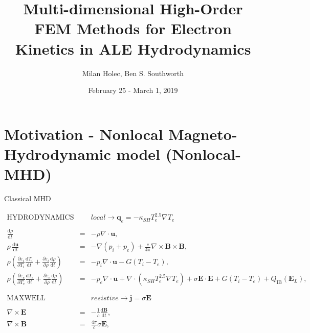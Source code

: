 \documentclass[8pt, compress]{beamer}
\title{{\Huge Multi-dimensional High-Order FEM Methods for Electron Kinetics in ALE Hydrodynamics}}
\date{{\huge February 25 - March 1, 2019}}
\author[Last Name]{{\Huge Milan Holec, Ben S. Southworth}}
\newcommand{\vect}[1]{\boldsymbol{#1}}
\newcommand{\dI}{\text{d}}
\newcommand{\E}{\vect{E}}
\newcommand{\Te}{T_e}
\begin{document}
\begin{frame}
 \titlepage
\end{frame}

\begin{frame}
  \tableofcontents
\end{frame}

\section{Motivation - Nonlocal Magneto-Hydrodynamic model (Nonlocal-MHD)}

\begin{frame}
\begin{center}
{\huge Classical MHD}  

\begin{eqnarray}
  \text{HYDRODYNAMICS} && 
  local \rightarrow \vect{q}_e = - \kappa_{SH} \Te^{2.5} \nabla \Te \nonumber \\
  && \nonumber \\
  \frac{\dI \rho}{\dI t} &=& - \rho\nabla\cdot\vect{u} , 
  \nonumber\\ 
  \rho\, \frac{\dI \vect{u}}{\dI t} &=& - \nabla (p_i + p_e) 
  + \frac{c}{4\pi}\nabla\times\vect{B}\times \vect{B}, 
  \nonumber\\   
  \rho \left(\frac{\partial \varepsilon_i}{\partial T_i}\frac{\dI T_i}{\dI t} 
  +\frac{\partial \varepsilon_i}{\partial \rho}\frac{\dI \rho}{\dI t}\right)
  &=& 
  - p_i\nabla\cdot\vect{u} - G(T_i - T_e) , 
  \nonumber\\
  \rho \left(\frac{\partial \varepsilon_e}{\partial T_e}\frac{\dI T_e}{\dI t}
  +\frac{\partial \varepsilon_e}{\partial \rho}\frac{\dI \rho}{\dI t}\right)
  &=& 
  - p_e \nabla\cdot\vect{u} 
  + \nabla\cdot\left(\kappa_{SH} \Te^{2.5} \nabla \Te \right) 
  + \sigma \E\cdot\E
  + G(T_i - T_e) + Q_{\text{IB}}(\vect{E}_L) , 
  \nonumber \\
  && \nonumber \\
  && \nonumber \\
  \text{MAXWELL EQUATIONS} && 
  resistive\rightarrow\vect{j} = \sigma \E \nonumber \\
  && \nonumber \\
  \nabla\times\vect{E} &=& -\frac{1}{c}\frac{\dI \vect{B}}{\dI t} ,
  \nonumber \\
  \nabla\times\vect{B} &=& \frac{4\pi}{c}
  \sigma \E ,%

\end{eqnarray}
\end{center}
\end{frame}
\end{document}
